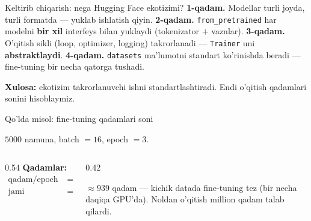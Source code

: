 \documentclass[aspectratio=169,11pt]{beamer}
\begin{document}
\begin{frame}{Keltirib chiqarish: nega Hugging Face ekotizimi?}
  \textbf{1-qadam.} Modellar turli joyda, turli formatda --- yuklab ishlatish qiyin.
  \pause
  \textbf{2-qadam.} \texttt{from\_pretrained} har modelni \textbf{bir xil}
  interfeys bilan yuklaydi (tokenizator $+$ vaznlar).
  \pause
  \textbf{3-qadam.} O'qitish sikli (loop, optimizer, logging) takrorlanadi ---
  \texttt{Trainer} uni \textbf{abstraktlaydi}.
  \pause
  \textbf{4-qadam.} \texttt{datasets} ma'lumotni standart ko'rinishda beradi ---
  fine-tuning bir necha qatorga tushadi.
  \begin{tcolorbox}[okbox,top=2pt,bottom=2pt]
    \small \textbf{Xulosa:} ekotizim takrorlanuvchi ishni standartlashtiradi.
    Endi o'qitish qadamlari sonini hisoblaymiz.
  \end{tcolorbox}
\end{frame}

\begin{frame}{Qo'lda misol: fine-tuning qadamlari soni}
  \begin{tcolorbox}[defbox,title={Trainer konfiguratsiyasi}]
    \small $5000$ namuna, batch $=16$, epoch $=3$.
  \end{tcolorbox}
  \vspace{0.2em}
  \begin{columns}[T]
    \begin{column}{0.54\textwidth}
      \textbf{Qadamlar:}
      \begin{align*}
        \text{qadam/epoch} &= \lceil 5000/16 \rceil = 313\\
        \text{jami} &= 313 \times 3 = \mathbf{939}
      \end{align*}
    \end{column}
    \begin{column}{0.42\textwidth}
      \begin{tcolorbox}[okbox,top=2pt,bottom=2pt]
        \footnotesize
        $\approx 939$ qadam --- kichik datada fine-tuning tez (bir necha daqiqa
        GPU'da). Noldan o'qitish million qadam talab qilardi.
      \end{tcolorbox}
    \end{column}
  \end{columns}
\end{frame}
\end{document}
